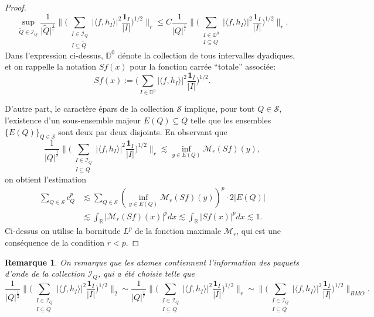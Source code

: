 \documentclass[11pt]{amsart}
\newtheorem*{remark}{Remarque}
\newcommand{\one}{\mathbf{1}}
\newcommand{\rr}{\mathbb}
\newcommand{\ii}{\mathscr}
\newcommand{\ic}{\mathcal}
\newcommand{\Dy}{{\mathbb D}}
\begin{document}
\begin{proof}
\[
\sup_{ \tilde Q \in \ii I_Q} \frac{1}{\vert \tilde  Q \vert^{\frac{1}{r}}} \big\| \big(  \sum_{\substack{ I \in \ii I_Q \\ I \subseteq \tilde Q}}  \vert \langle f, h_I  \rangle \vert^2 \frac{\one_I}{\vert I \vert} \big)^{1/2}  \big\|_r \leq C  \frac{1}{\vert   Q \vert^{\frac{1}{r}}} \big\| \big(  \sum_{\substack{ I \in \Dy^0 \\ I \subseteq  Q}}  \vert \langle f, h_I  \rangle \vert^2 \frac{\one_I}{\vert I \vert} \big)^{1/2}  \big\|_r.
\]
Dans l'expression ci-dessus, $\Dy^0$ d\'enote la collection de tous intervalles dyadiques, et on rappelle la notation $Sf(x)$ pour la fonction carr\'ee ``totale''  associ\'ee:
$$ Sf(x):=\big(  \sum_{I \in \Dy^0} \vert \langle f, h_I  \rangle \vert^2 \frac{\one_I}{\vert I \vert} \big)^{1/2}.$$

D'autre part, le caract\`ere \'epars de la collection $\ic S$ implique, pour tout $Q \in \ic S$, l'existence d'un sous-ensemble majeur $E(Q) \subseteq Q$ telle que les ensembles  $\lbrace E(Q) \rbrace_{Q \in \ic S}$ sont deux par deux disjoints. En observant que 
\[
\frac{1}{\vert Q \vert^{\frac{1}{r}}} \big\| \big(  \sum_{\substack{ I \in \ii I_Q \\ I \subseteq Q}}  \vert \langle f, h_I  \rangle \vert^2 \frac{\one_I}{\vert I \vert} \big)^{1/2}  \big\|_r \lesssim \inf_{y \in E\left( Q \right)} \ic M_r (Sf)(y),
\]
on obtient l'estimation 
\begin{align*}
\sum_{Q \in \ic S} c_Q^p &\lesssim \sum_{Q \in \ic S} \left( \inf_{y \in E\left( Q \right)} \ic M_r (Sf)(y) \right)^p \cdot 2 \vert E(Q)  \vert \\
&\lesssim \int_{\rr R} \vert \ic M_r (Sf)(x) \vert^p dx \lesssim \int_{\rr R} \vert Sf (x) \vert^p dx \lesssim 1.
\end{align*}
Ci-dessus on utilise la bornitude $L^p$ de la fonction maximale $\ic M_r$, qui est une cons\'equence de la condition $r<p$.
\end{proof}


\begin{remark}
On remarque que les atomes contiennent l'information des paquets d'onde de la collection $\ii I_Q$, qui a \'et\'e choisie telle que 
{\fontsize{10.5}{10}\[
\frac{1}{\vert Q \vert^{\frac{1}{2}}} \big\| \big(  \sum_{\substack{ I \in \ii I_Q \\ I \subseteq Q}}  \vert \langle f, h_I  \rangle \vert^2 \frac{\one_I}{\vert I \vert} \big)^{1/2}  \big\|_2 \sim \frac{1}{\vert Q \vert^{\frac{1}{r}}} \big\| \big(  \sum_{\substack{ I \in \ii I_Q \\ I \subseteq Q}}  \vert \langle f, h_I  \rangle \vert^2 \frac{\one_I}{\vert I \vert} \big)^{1/2}  \big\|_r \sim  \big\| \big(  \sum_{\substack{ I \in \ii I_Q \\ I \subseteq Q}}  \vert \langle f, h_I  \rangle \vert^2 \frac{\one_I}{\vert I \vert} \big)^{1/2}  \big\|_{BMO}.
\]}
\end{remark}
\end{document}
